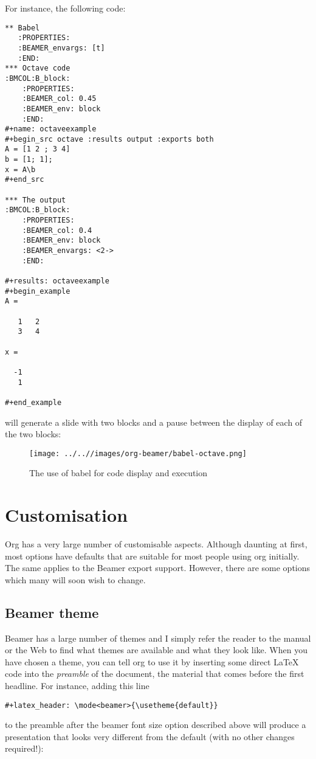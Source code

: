 \documentclass[presentation]{beamer}
\begin{document}
For instance, the following code:
\begin{verbatim}
** Babel
   :PROPERTIES:
   :BEAMER_envargs: [t]
   :END:
*** Octave code                                                      :BMCOL:B_block:
    :PROPERTIES:
    :BEAMER_col: 0.45
    :BEAMER_env: block
    :END:
#+name: octaveexample
#+begin_src octave :results output :exports both
A = [1 2 ; 3 4]
b = [1; 1];
x = A\b
#+end_src

*** The output                                               :BMCOL:B_block:
    :PROPERTIES:
    :BEAMER_col: 0.4
    :BEAMER_env: block
    :BEAMER_envargs: <2->
    :END:

#+results: octaveexample
#+begin_example
A =

   1   2
   3   4

x =

  -1
   1

#+end_example

\end{verbatim}

will generate a slide with two blocks and a pause between the display
of each of the two blocks:

\begin{figure}[htbp]
\centering
\texttt{[image: ../..//images/org-beamer/babel-octave.png]}
\caption{The use of babel for code display and execution}
\end{figure}

\section{Customisation}
\label{sec:org68e4578}

Org has a very large number of customisable aspects.  Although
daunting at first, most options have defaults that are suitable for
most people using org initially.  The same applies to the Beamer
export support.  However, there are some options which many will soon
wish to change.

\subsection{Beamer theme}
\label{sec:orgb7df606}

Beamer has a large number of themes and I simply refer the reader to
the manual or the Web to find what themes are available and what they
look like.  When you have chosen a theme, you can tell org to use it
by inserting some direct \LaTeX{} code into the \emph{preamble} of the
document, the material that comes before the first headline.  For
instance, adding this line
\begin{verbatim}
#+latex_header: \mode<beamer>{\usetheme{default}}
\end{verbatim}
to the preamble after the beamer font size
option described above will produce a presentation that looks very
different from the default (with no other changes required!):
\end{document}
